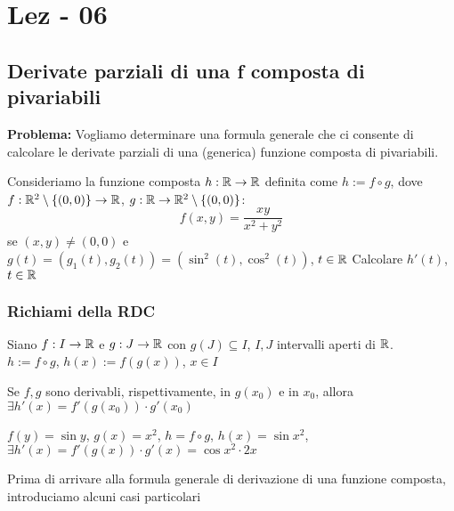 \section{Lez - 06}
\subsection{Derivate parziali di una f composta di pi\acu variabili}
\textbf{Problema:} Vogliamo determinare una formula generale che ci consente di calcolare le derivate parziali di una (generica)
funzione composta di pi\acu variabili.
\begin{exercise}[7, foglio 3]
  Consideriamo la funzione composta $h: \mathbb{R} \to \mathbb{R}$ definita come $h := f \circ g$, dove $f : \mathbb{R}^2 \setminus \{(0,0)\} \to \mathbb{R}$,
  $g:\mathbb{R}\to \mathbb{R}^2\setminus \{(0,0)\}$:
  $$f(x,y)=\frac{xy}{x^2+y^2}$$
  se $(x,y)\neq (0,0)$ e\\
  $g(t) = (g_1(t),g_2(t)) = (\sin^2(t),\cos^2(t))$, $t\in \mathbb{R}$
  Calcolare $h'(t)$, $t\in \mathbb{R}$
\end{exercise}
\subsubsection{Richiami della RDC}
Siano $f: I \to \mathbb{R}$ e $g: J \to \mathbb{R}$ con $g(J)\subseteq I$, $I,J$ intervalli aperti di $\mathbb{R}$. \\
$h:= f\circ g$, $h(x):=f(g(x))$, $x\in I$
\begin{proposition}
  Se $f,g$ sono derivabli, rispettivamente, in $g(x_0)$ e in $x_0$, allora $\exists h'(x) = f'(g(x_0))\cdot g'(x_0)$
\end{proposition}
\begin{example}
  $f(y) = \sin{y}$, $g(x) = x^2$, $h = f\circ g$, $h(x) = \sin{x^2}$, 
  $\exists h'(x) = f'(g(x))\cdot g'(x) = \cos{x^2}\cdot 2x$
\end{example}
Prima di arrivare alla formula generale di derivazione di una funzione composta, introduciamo alcuni casi particolari

